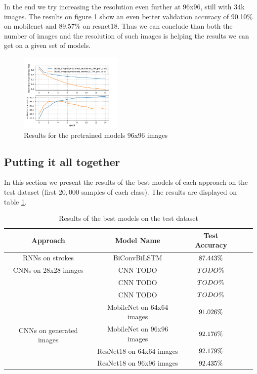 \documentclass[10pt,twocolumn,letterpaper]{article}
\begin{document}
In the end we try increasing the resolution even further at 96x96, still with 34k images. The results on figure \ref{fig:imgen_96} show an even better validation accuracy of 90.10\% on mobilenet and 89.57\% on resnet18. Thus we can conclude than both the number of images and the resolution of such images is helping the results we can get on a given set of models.

\begin{figure}[h] 
\centering
\includegraphics[width=0.45\textwidth]{images/imgen_96.png}
\caption{Results for the pretrained models 96x96 images}
\label{fig:imgen_96}
\end{figure}


\subsection{Putting it all together}

In this section we present the results of the best models of each approach on the test dataset (first $20,000$ samples of each class).
The results are displayed on table \ref{tab:final_results}.

\begin{table}[h]
    \centering
    \begin{tabular}{|c|c|c|c|c}
        \hline
          Approach & Model Name & Test Accuracy  \\
          \hline\hline
         RNNs on strokes & BiConvBiLSTM & $87.443\space \%$ \\
          \hline
         \multirow{1}{4em}{CNNs on 28x28 images} & CNN TODO & $TODO\space \%$ \\
         & CNN TODO & $TODO\space \%$ \\
         & CNN TODO & $TODO\space \%$ \\
          \hline
         \multirow{4}{4em}{CNNs on generated images} & MobileNet on 64x64 images & $91.026\space \%$ \\
         & MobileNet on 96x96 images & $92.176\space \%$ \\
         & ResNet18 on 64x64 images & $92.179\space \%$ \\
         & ResNet18 on 96x96 images & $92.435\space \%$ \\
         \hline
    \end{tabular}
    \caption{Results of the best models on the test dataset}
    \label{tab:final_results}
\end{table}
\end{document}
